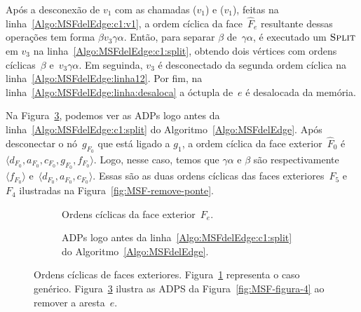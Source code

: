Após a desconexão de $v_1$ com as chamadas \LCOCycle($v_1$) e \LCOSplit($v_1$), feitas na linha~\ref{Algo:MSFdelEdge:c1:v1}, a ordem cíclica da face~$\hat F_e$ resultante dessas operações tem forma $\beta v_3\gamma\alpha$.
Então, para separar $\beta$ de~$\gamma\alpha$, é executado um $\text{\scshape Split}$ em $v_3$ na linha~\ref{Algo:MSFdelEdge:c1:split}, obtendo dois vértices com ordens cíclicas~$\beta$ e~$v_3\gamma\alpha$.
Em seguinda, $v_3$ é desconectado da segunda ordem cíclica na linha~\ref{Algo:MSFdelEdge:linha12}.
Por fim, na linha~\ref{Algo:MSFdelEdge:linha:desaloca} a óctupla de~$e$ é desalocada da memória.

Na Figura~\ref{fig:MSF-ordem-ciclica-ponte-e}, podemos ver as ADPs logo antes da linha~\ref{Algo:MSFdelEdge:c1:split} do Algoritmo~\ref{Algo:MSFdelEdge}.
Após desconectar o nó~$g_{F_0}$ que está ligado a $g_1$, a ordem cíclica da face exterior~$\hat F_0$ é $\langle d_{F_0}, a_{F_0}, c_{F_0}, g_{F_0}, f_{F_0}\rangle$.
Logo, nesse caso, temos que $\gamma\alpha$ e $\beta$ são respectivamente $\langle f_{F_0} \rangle$ e~$\langle d_{F_0}, a_{F_0}, c_{F_0}\rangle$.
Essas são as duas ordens cíclicas das faces exteriores~$F_5$ e $F_4$ ilustradas na Figura~\ref{fig:MSF-remove-ponte}.

\begin{figure}[htb]
\begin{subfigure}{.4\textwidth}

\caption{Ordens cíclicas da face exterior~$F_e$.}
\label{fig:MSF-ordem-ciclica-ponte}
\end{subfigure}
\hfill
\begin{subfigure}{.4\textwidth}

\caption{ADPs logo antes da linha~\ref{Algo:MSFdelEdge:c1:split} do Algoritmo~\ref{Algo:MSFdelEdge}.}
\label{fig:MSF-ordem-ciclica-ponte-e}
\end{subfigure}
	\caption{Ordens cíclicas de faces exteriores. Figura~\ref{fig:MSF-ordem-ciclica-ponte} representa o caso genérico. Figura~\ref{fig:MSF-ordem-ciclica-ponte-e} ilustra as ADPS da Figura~\ref{fig:MSF-figura-4} ao remover a aresta~$e$.}
\end{figure}



